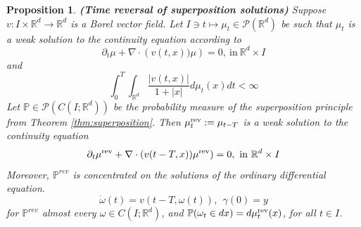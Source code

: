 \documentclass{article}
\newtheorem{proposition}[theorem]{Proposition}
\newcommand{\Rd}{\mathbb{R}^d}
\begin{document}
\begin{proposition}\textbf{(Time reversal of superposition solutions)}
\label{prop:time-reversal}
Suppose $v: I \times \Rd \rightarrow \Rd$ is a Borel vector field. Let $I \ni t \mapsto \mu_t \in \mathcal{P}(\Rd)$ be such that $\mu_t$ is a weak solution to the continuity equation according to 
\begin{equation}
\partial_t \mu+  \nabla \cdot \left(v(t,x)) \mu \right) =0, ~ \text{in}~ \Rd \times I 
\end{equation}
and 
\[ \int_0^T \int_{\Rd} \frac{|v(t,x)|}{1+|x|}d\mu_t(x) dt < \infty \]
Let $\mathbb{P} \in \mathcal{P}(C(I;\Rd))$ be the probability measure of the superposition principle from Theorem \ref{thm:superposition}. Then $\mu^{\rm rev}_t : = \mu_{t-T}$ is a weak solution to the continuity equation 
\begin{equation}
\partial_t \mu^{\rm rev}+  \nabla \cdot \left(v(t-T,x)) \mu^{\rm rev}  \right) =0, ~ \text{in}~ \Rd \times I 
\end{equation}
Moreover, $\mathbb{P}^{rev}$ is concentrated on the solutions of the ordinary differential equation.
\begin{equation}
	\dot{\omega}(t) = v(t-T,\omega(t)),~~ \gamma(0) = y
\end{equation}
for $\mathbb{P}^{rev}$ almost every $\omega \in C(I;\Rd)$, and $\mathbb{P}(\omega_t \in dx) = d\mu^{\rm rev}_t(x)$, for all $t \in I$.
\end{proposition}
\end{document}
